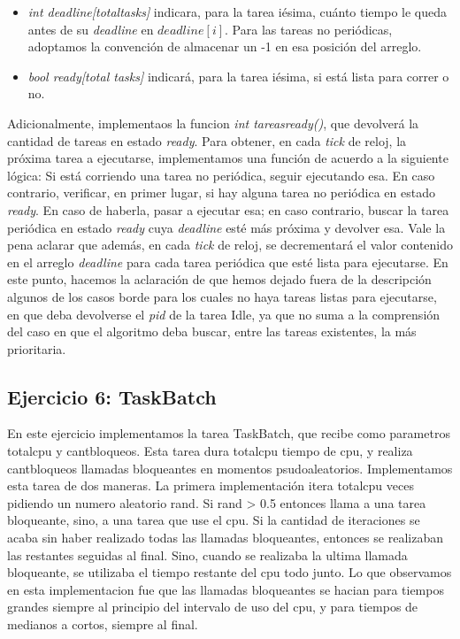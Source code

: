 \begin{itemize}
  \item \textit{int deadline[totaltasks]} indicara, para la tarea i\'esima, cu\'anto tiempo le queda antes de su \textit{deadline} en $deadline[i]$. Para las tareas
  no peri\'odicas, adoptamos la convenci\'on de almacenar un -1 en esa posici\'on del arreglo.
  \item \textit{bool ready[total tasks]} indicar\'a, para la tarea i\'esima, si est\'a lista para correr o no.
\end{itemize}

Adicionalmente, implementaos la funcion \textit{int tareasready()}, que devolver\'a la cantidad de tareas en estado \textit{ready}.
Para obtener, en cada \textit{tick} de reloj, la pr\'oxima tarea a ejecutarse, implementamos una funci\'on de acuerdo a la siguiente l\'ogica:
Si est\'a corriendo una tarea no peri\'odica, seguir ejecutando esa. En caso contrario, verificar, en primer lugar, si hay alguna tarea
no peri\'odica en estado \textit{ready}. En caso de haberla, pasar a ejecutar esa; en caso contrario, buscar la tarea peri\'odica en estado
\textit{ready} cuya \textit{deadline} est\'e m\'as pr\'oxima y devolver esa. Vale la pena aclarar
que adem\'as, en cada \textit{tick} de reloj, se decrementar\'a el valor contenido en el arreglo \textit{deadline} para cada tarea peri\'odica que est\'e
lista para ejecutarse. En este punto, hacemos la aclaraci\'on de que hemos dejado fuera de la descripci\'on algunos de los casos borde para los cuales no 
haya tareas listas para ejecutarse, en que deba devolverse el \textit{pid} de la tarea Idle, ya que no suma a la comprensi\'on del caso en que el algoritmo
deba buscar, entre las tareas existentes, la m\'as prioritaria.

\subsection{Ejercicio 6: TaskBatch}

En este ejercicio implementamos la tarea TaskBatch, que recibe como parametros totalcpu y cantbloqueos. Esta tarea dura totalcpu tiempo de 
cpu, y realiza cantbloqueos llamadas bloqueantes en momentos psudoaleatorios. Implementamos esta tarea de dos maneras. La primera implementaci\'on itera totalcpu
veces pidiendo un numero aleatorio rand. Si rand > 0.5 entonces llama a una tarea bloqueante, sino, a una tarea que use el cpu. Si la cantidad 
de iteraciones se acaba sin haber realizado todas las llamadas bloqueantes, entonces se realizaban las restantes seguidas al final. Sino, cuando se realizaba
la ultima llamada bloqueante, se utilizaba el tiempo restante del cpu todo junto. Lo que observamos en esta implementacion fue que las llamadas bloqueantes
se hacian para tiempos grandes siempre al principio del intervalo de uso del cpu, y para tiempos de medianos a cortos, siempre al final.

